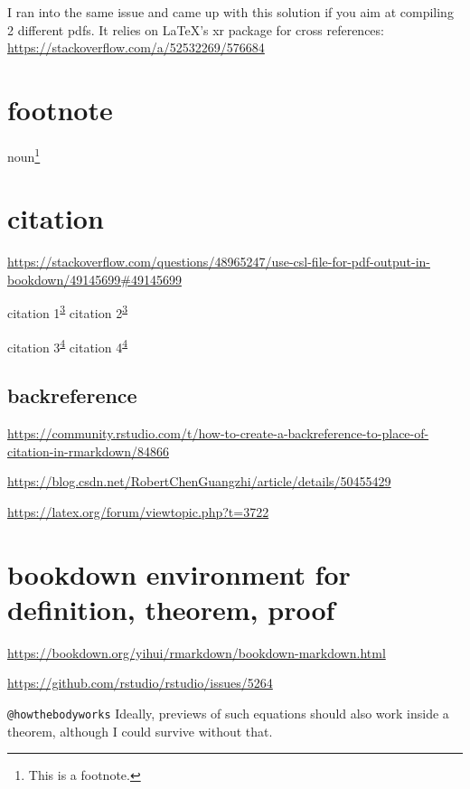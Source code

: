 \documentclass[
]{book}
\theoremstyle{definition}
\theoremstyle{definition}
\theoremstyle{definition}
\theoremstyle{definition}
\theoremstyle{remark}
\begin{document}
I ran into the same issue and came up with this solution if you aim at compiling 2 different pdfs. It relies on LaTeX's xr package for cross references: \url{https://stackoverflow.com/a/52532269/576684}

\hypertarget{footnote-1}{%
\section{footnote}\label{footnote-1}}

noun\footnote{This is a footnote.}

\hypertarget{citation}{%
\section{citation}\label{citation}}

\url{https://stackoverflow.com/questions/48965247/use-csl-file-for-pdf-output-in-bookdown/49145699\#49145699}

citation 1\textsuperscript{\protect\hyperlink{ref-noauthor_bookdown_2019}{3}} citation 2\textsuperscript{\protect\hyperlink{ref-noauthor_bookdown_2019}{3}}

citation 3\textsuperscript{\protect\hyperlink{ref-ccjou2009}{4}} citation 4\textsuperscript{\protect\hyperlink{ref-ccjou2009}{4}}

\hypertarget{backreference}{%
\subsection{backreference}\label{backreference}}

\url{https://community.rstudio.com/t/how-to-create-a-backreference-to-place-of-citation-in-rmarkdown/84866}

\url{https://blog.csdn.net/RobertChenGuangzhi/article/details/50455429}

\url{https://latex.org/forum/viewtopic.php?t=3722}

\hypertarget{bookdown-environment-for-definition-theorem-proof}{%
\section{bookdown environment for definition, theorem, proof}\label{bookdown-environment-for-definition-theorem-proof}}

\url{https://bookdown.org/yihui/rmarkdown/bookdown-markdown.html}

\url{https://github.com/rstudio/rstudio/issues/5264}

\texttt{@howthebodyworks} Ideally, previews of such equations should also work inside a theorem, although I could survive without that.
\end{document}
